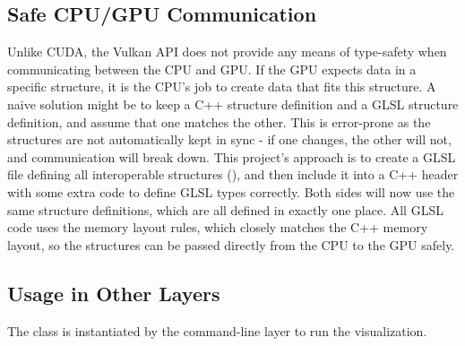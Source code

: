 \subsection{Safe CPU/GPU Communication}\label{sec:Impl:Viz:CPUGPUSafety}
Unlike CUDA, the Vulkan API does not provide any means of type-safety when communicating between the CPU and GPU.
If the GPU expects data in a specific structure, it is the CPU's job to create data that fits this structure.
A naive solution might be to keep a C++ structure definition and a GLSL structure definition, and assume that one matches the other.
This is error-prone as the structures are not automatically kept in sync - if one changes, the other will not, and communication will break down.
This project's approach is to create a GLSL file defining all interoperable structures (), and then include it into a C++ header with some extra code to define GLSL types correctly.
Both sides will now use the same structure definitions, which are all defined in exactly one place.
All GLSL code uses the  memory layout rules, which closely matches the C++ memory layout, so the structures can be passed directly from the CPU to the GPU safely.

\subsection{Usage in Other Layers}
The  class is instantiated by the command-line layer to run the visualization.